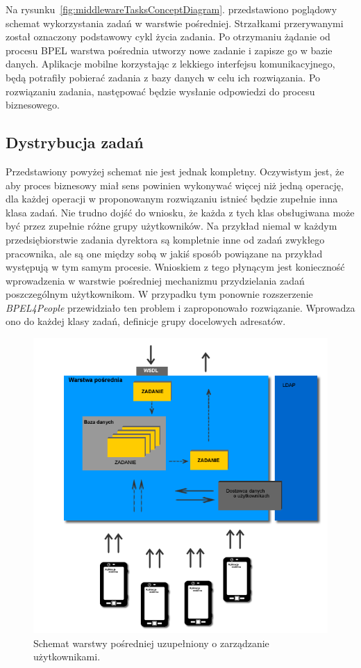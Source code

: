 Na rysunku~\ref{fig:middlewareTasksConceptDiagram}. przedstawiono poglądowy schemat wykorzystania zadań w warstwie pośredniej. Strzałkami przerywanymi został oznaczony podstawowy cykl życia zadania. Po otrzymaniu żądanie od procesu BPEL warstwa pośrednia utworzy nowe zadanie i zapisze go w bazie danych. Aplikacje mobilne korzystając z lekkiego interfejsu komunikacyjnego, będą potrafiły pobierać zadania z bazy danych w celu ich rozwiązania. Po rozwiązaniu zadania, następować będzie wysłanie odpowiedzi do procesu biznesowego. 

\subsection{Dystrybucja zadań}
Przedstawiony powyżej schemat nie jest jednak kompletny. Oczywistym jest, że aby proces biznesowy miał sens powinien wykonywać więcej niż jedną operację, dla każdej operacji w proponowanym rozwiązaniu istnieć będzie zupełnie inna klasa zadań. Nie trudno dojść do wniosku, że każda z tych klas obsługiwana może być przez zupełnie różne grupy użytkowników. Na przykład niemal w każdym przedsiębiorstwie zadania dyrektora są kompletnie inne od zadań zwykłego pracownika, ale są one między sobą w jakiś sposób powiązane na przykład występują w tym samym procesie. Wnioskiem z tego płynącym jest konieczność wprowadzenia w warstwie pośredniej mechanizmu przydzielania zadań poszczególnym użytkownikom. W przypadku tym ponownie rozszerzenie \textit{BPEL4People} przewidziało ten problem i zaproponowało rozwiązanie. Wprowadza ono do każdej klasy zadań, definicje grupy docelowych adresatów. 

\begin{figure}[h]
\centerline{\includegraphics[scale=0.5]{middlewareUserDataProviderConceptDiagram}}
\caption{Schemat warstwy pośredniej uzupełniony o zarządzanie użytkownikami.}
\label{fig:middlewareUserDataProviderConceptDiagram}
\end{figure}

